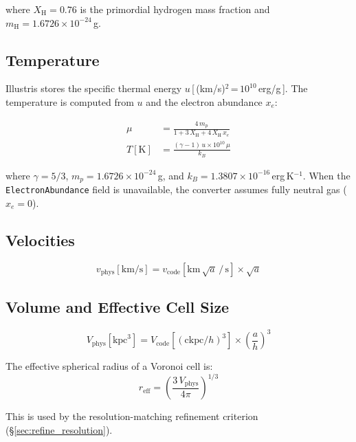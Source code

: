 \documentclass[english,a4paper]{my_memo}
\begin{document}
where $X_\mathrm{H} = 0.76$ is the primordial hydrogen mass fraction
and $m_\mathrm{H} = 1.6726 \times 10^{-24}$\,g.

\subsection{Temperature}
\label{sec:temperature}

Illustris stores the specific thermal energy
$u$\,[\,(km/s)$^2$\,=\,$10^{10}$\,erg/g\,].  The temperature is
computed from $u$ and the electron abundance $x_e$:

\begin{align}
\mu &= \frac{4\,m_p}{1 + 3\,X_\mathrm{H} + 4\,X_\mathrm{H}\,x_e} \\[6pt]
T[\mathrm{K}] &= \frac{(\gamma - 1)\,u\times 10^{10}\,\mu}{k_B}
\end{align}

where $\gamma = 5/3$, $m_p = 1.6726\times 10^{-24}$\,g, and
$k_B = 1.3807\times 10^{-16}$\,erg\,K$^{-1}$.
When the \texttt{ElectronAbundance} field is unavailable, the converter
assumes fully neutral gas ($x_e = 0$).

\subsection{Velocities}

\begin{equation}
v_\mathrm{phys}[\mathrm{km/s}]
  = v_\mathrm{code}[\mathrm{km}\,\sqrt{a}\,/\,\mathrm{s}]
    \times \sqrt{a}
\end{equation}

\subsection{Volume and Effective Cell Size}

\begin{equation}
V_\mathrm{phys}[\mathrm{kpc}^3]
  = V_\mathrm{code}[(\mathrm{ckpc}/h)^3] \times \left(\frac{a}{h}\right)^3
\end{equation}

The effective spherical radius of a Voronoi cell is:
\begin{equation}
r_\mathrm{eff} = \left(\frac{3\,V_\mathrm{phys}}{4\pi}\right)^{1/3}
\label{eq:reff}
\end{equation}

This is used by the resolution-matching refinement criterion
(\S\ref{sec:refine_resolution}).
\end{document}
